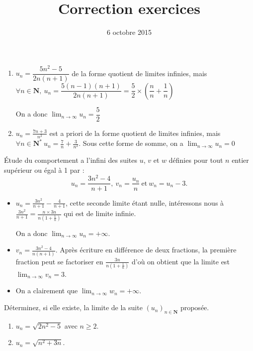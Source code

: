 \documentclass[a4paper,12pt,french]{article}
\title{Correction exercices}
\date{6 octobre 2015}
\newcommand{\N}{\mathbf{N}}
\begin{document}
\maketitle

\begin{Exercise}[number=19]
  \begin{enumerate}[label=\alph*)]
    \item $u_n = \dfrac{5n^2 - 5}{2n(n+1)} $ de la forme quotient de
      limites infinies, mais $\forall n \in \N,\ u_n = \dfrac{5 (n-1)
      (n+1) }{2n (n+1)} = \dfrac52 \times \left(\dfrac{n}{n} +
      \dfrac{1}{n}\right)$

      On a donc $\lim_{n\to\infty} u_n = \dfrac52 $
    \item $u_n = \frac{7n + 3}{n^2}$ est a priori de la forme quotient
      de limites infinies, mais $\forall n \in \N^*\ u_n = \frac7n +
      \frac3{n^2}$. Sous cette forme de somme, on a
      $\lim_{n\to\infty}u_n = 0$
  \end{enumerate}
\end{Exercise}
\begin{Exercise}[number=20]
  Étude du comportement a l'infini des suites $u$, $v$ et $w$ définies
  pour tout $n$ entier supérieur ou égal à 1 par : \[ u_n = \frac{3n^2
    -4}{n+1},\ v_n = \frac{u_n}{n}\ \text{et}\ w_n = u_n - 3.\]

\end{Exercise}
\begin{Answer}[number=20]
  \begin{itemize}[label=\textbullet]
    \item $u_n = \frac{3n^2}{n+1} - \frac{4}{n+1}$, cette seconde limite
      étant nulle, intéressons nous à $\frac{3n^2}{n+1} = \frac{n\times
      3n}{n\left(1+\frac1n\right)}$ qui est de limite infinie.

        On a donc $\boxed{\lim_{n\to\infty}u_n = +\infty}$.
      \item $v_n = \frac{3n^2-4}{n(n+1)}$. Après écriture en différence
        de deux fractions, la première fraction peut se factoriser en
        $\frac{3n}{n\left(1+\frac1n\right)}$ d'où on obtient que la
        limite est $\boxed{\lim_{n\to\infty}v_n = 3}$.
      \item On a clairement que $\boxed{\lim_{n\to\infty}w_n = +
        \infty}$.
    \end{itemize}
\end{Answer}

\begin{Exercise}
  Déterminez, si elle existe, la limite de la suite $(u_n)_{n\in\N}$
  proposée.
  \begin{enumerate}[label=\alph*)]
    \item $u_n = \sqrt{2n^2 - 5}$ avec $n \geqslant 2$.
    \item $u_n = \sqrt{n^2 + 3n}$.
  \end{enumerate}
\end{Exercise}
\end{document}
